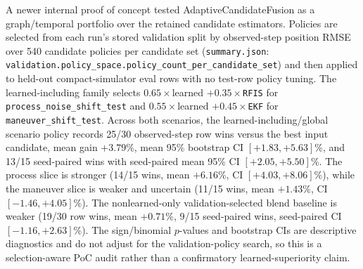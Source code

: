 \documentclass{article}
\begin{document}
A newer internal proof of concept tested AdaptiveCandidateFusion as a graph/temporal portfolio over the retained candidate estimators. Policies are selected from each run's stored validation split by observed-step position RMSE over 540 candidate policies per candidate set (\texttt{summary.json}: \texttt{validation.policy\_space.policy\_count\_per\_candidate\_set}) and then applied to held-out compact-simulator eval rows with no test-row policy tuning. The learned-including family selects \(0.65\times\)learned \(+0.35\times\)\texttt{RFIS} for \texttt{process\_noise\_shift\_test} and \(0.55\times\)learned \(+0.45\times\)\texttt{EKF} for \texttt{maneuver\_shift\_test}. Across both scenarios, the learned-including/global scenario policy records 25/30 observed-step row wins versus the best input candidate, mean gain \(+3.79\)\%, mean 95\% bootstrap CI \([+1.83,+5.63]\)\%, and 13/15 seed-paired wins with seed-paired mean 95\% CI \([+2.05,+5.50]\)\%. The process slice is stronger (14/15 wins, mean \(+6.16\)\%, CI \([+4.03,+8.06]\)\%), while the maneuver slice is weaker and uncertain (11/15 wins, mean \(+1.43\)\%, CI \([-1.46,+4.05]\)\%). The nonlearned-only validation-selected blend baseline is weaker (19/30 row wins, mean \(+0.71\)\%, 9/15 seed-paired wins, seed-paired CI \([-1.16,+2.63]\)\%). The sign/binomial \(p\)-values and bootstrap CIs are descriptive diagnostics and do not adjust for the validation-policy search, so this is a selection-aware PoC audit rather than a confirmatory learned-superiority claim.
\end{document}

